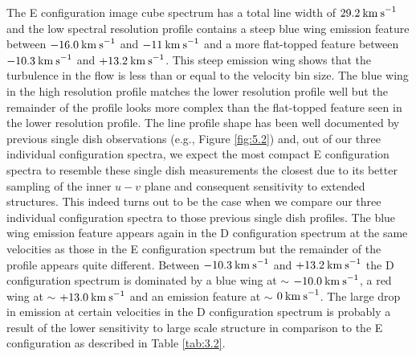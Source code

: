 The E configuration image cube spectrum has a total line width of $29.2\>{\rm km\>s}^{-1}$ and the low spectral resolution profile contains a steep blue wing emission feature between $-16.0\>{\rm km\>s}^{-1}$ and $-11\>{\rm km\>s}^{-1}$ and a more flat-topped feature between $-10.3\>{\rm km\>s}^{-1}$ and $+13.2\>{\rm km\>s}^{-1}$. This steep emission wing shows that the turbulence in the flow is less than or equal to the velocity bin size. The blue wing in the high resolution profile matches the lower resolution profile well but the remainder of the profile looks more complex than the flat-topped feature seen in the lower resolution profile. The line profile shape has been well documented by previous single dish observations (e.g., Figure \ref{fig:5.2}) and, out of our three individual configuration spectra, we expect the most compact E configuration spectra to resemble these single dish measurements the closest due to its better sampling of the inner $u-v$ plane and consequent sensitivity to extended structures. This indeed turns out to be the case when we compare our three individual configuration spectra to those previous single dish profiles. The blue wing emission feature appears again in the D configuration spectrum at the same velocities as those in the E configuration spectrum but the remainder of the profile appears quite different. Between $-10.3\>{\rm km\>s}^{-1}$ and $+13.2\>{\rm km\>s}^{-1}$ the D configuration spectrum is dominated by a blue wing at $\sim$ $-10.0\>{\rm km\>s}^{-1}$, a red wing at $\sim$ $+13.0\>{\rm km\>s}^{-1}$ and an emission feature at $\sim$ $0\>{\rm km\>s}^{-1}$. The large drop in emission at certain velocities in the D configuration spectrum is probably a result of the lower sensitivity to large scale structure in comparison to the E configuration as described in Table \ref{tab:3.2}.


